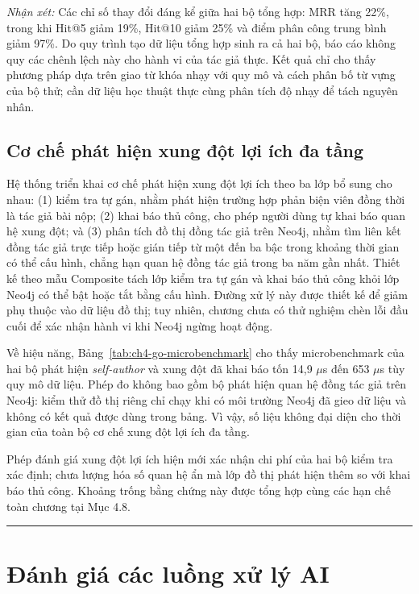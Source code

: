 \textit{Nhận xét:} Các chỉ số thay đổi đáng kể giữa hai bộ tổng hợp: MRR tăng 22\%, trong khi Hit@5 giảm 19\%, Hit@10 giảm 25\% và điểm phân công trung bình giảm 97\%. Do quy trình tạo dữ liệu tổng hợp sinh ra cả hai bộ, báo cáo không quy các chênh lệch này cho hành vi của tác giả thực. Kết quả chỉ cho thấy phương pháp dựa trên giao từ khóa nhạy với quy mô và cách phân bố từ vựng của bộ thử; cần dữ liệu học thuật thực cùng phân tích độ nhạy để tách nguyên nhân.

\subsection{Cơ chế phát hiện xung đột lợi ích đa tầng}

Hệ thống triển khai cơ chế phát hiện xung đột lợi ích theo ba lớp bổ sung cho nhau: (1) kiểm tra tự gán, nhằm phát hiện trường hợp phản biện viên đồng thời là tác giả bài nộp; (2) khai báo thủ công, cho phép người dùng tự khai báo quan hệ xung đột; và (3) phân tích đồ thị đồng tác giả trên Neo4j, nhằm tìm liên kết đồng tác giả trực tiếp hoặc gián tiếp từ một đến ba bậc trong khoảng thời gian có thể cấu hình, chẳng hạn quan hệ đồng tác giả trong ba năm gần nhất. Thiết kế theo mẫu Composite tách lớp kiểm tra tự gán và khai báo thủ công khỏi lớp Neo4j có thể bật hoặc tắt bằng cấu hình. Đường xử lý này được thiết kế để giảm phụ thuộc vào dữ liệu đồ thị; tuy nhiên, chương chưa có thử nghiệm chèn lỗi đầu cuối để xác nhận hành vi khi Neo4j ngừng hoạt động.

Về hiệu năng, Bảng~\ref{tab:ch4-go-microbenchmark} cho thấy microbenchmark của hai bộ phát hiện \textit{self-author} và xung đột đã khai báo tốn 14,9 \(\mu\)s đến 653 \(\mu\)s tùy quy mô dữ liệu. Phép đo không bao gồm bộ phát hiện quan hệ đồng tác giả trên Neo4j: kiểm thử đồ thị riêng chỉ chạy khi có môi trường Neo4j đã gieo dữ liệu và không có kết quả được dùng trong bảng. Vì vậy, số liệu không đại diện cho thời gian của toàn bộ cơ chế xung đột lợi ích đa tầng.

Phép đánh giá xung đột lợi ích hiện mới xác nhận chi phí của hai bộ kiểm tra xác định; chưa lượng hóa số quan hệ ẩn mà lớp đồ thị phát hiện thêm so với khai báo thủ công. Khoảng trống bằng chứng này được tổng hợp cùng các hạn chế toàn chương tại Mục 4.8.

\par\noindent\rule{\textwidth}{0.4pt}\par

\section{Đánh giá các luồng xử lý AI}

